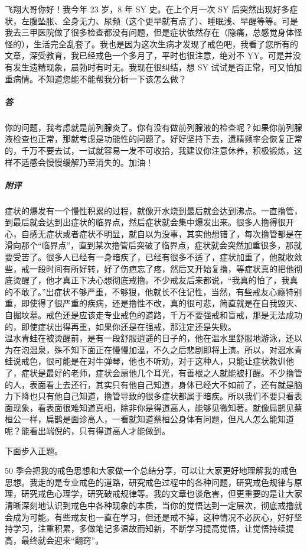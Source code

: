 \begin{case}
    飞翔大哥你好！我今年 23 岁，8 年 SY 史。在上个月一次 SY 后突然出现好多症状，左腹坠胀、全身无力、尿频（这个更早就有点了）、睡眠浅、早醒等等。可是我去三甲医院做了很多检查都没有问题，但是症状依然存在（隐痛，总感觉身体怪怪的），生活完全乱套了。我也是因为这次生病才发现了戒色吧，我看了您所有的文章，深受教育，我已经戒色一个多月了，平时也很注意，绝对不 YY。可是并没有发生遗精现象，晨勃时有时无。我现在很纠结，想 SY 试试是否正常，可又怕加重病情。不知道您能不能帮我分析一下该怎么做？
    \subparagraph{答} 你的问题，我考虑就是前列腺炎了。你有没有做前列腺液的检查呢？如果你前列腺液检查也正常，那就考虑是功能性的问题了。好好坚持下去，遗精频率会恢复正常的，千万不要去试，一试就容易一发不可收拾，我建议你注意休养，积极锻炼，这样不适感会慢慢缓解乃至消失的。加油！
    \subparagraph{附评} 症状的爆发有一个慢性积累的过程，就像开水烧到最后就会达到沸点。一直撸管，到最后就会达到出症状的临界点，然后症状就会集中爆发出来。很多人撸得很开心，自感无症状或者症状不明显，就自以为没事，其实他想错了，每次撸管都是在滑向那个“临界点”，直到某次撸管后突破了临界点，症状就会突然加重很多，那就要受苦了。很多人已经有一身暗疾了，已经有很多不适了，症状加重了，他就收敛些，戒一段时间有所好转，好了伤疤忘了疼，然后又开始复撸，等症状真的把他彻底烫醒了，他才真正下决心想彻底戒撸。不少戒友后来都说，“我真的怕了，我真的不敢了。”出症状不够严重，不够狠，他就长不住记性，当然，有些戒友心瘾特别重，即使得了很严重的疾病，还是撸性不改，真的很可悲，简直就是在自我毁灭、自掘坟墓。戒色还是应该走专业戒色的道路，千万不要强戒和盲戒，那是无法成功的，即使症状出得再重，如果你还是在强戒，那注定还是失败。\\ 温水青蛙在被烫醒前，是有一段舒服逍遥的日子的，他在温水里舒服地游泳，还以为在泡温泉，殊不知下面正在慢慢加温，不久之后悲剧即将上演。所以，对温水青蛙说戒色，很可能是在对牛弹琴，他也不听劝，对于这种人，只能让症状教训他了，症状是最好的老师，症状会扇他几个耳光，有善根之人就能被打醒。不少撸管的人，表面看上去还行，其实只有他自己知道，身体已经大不如前了，还有就是脑力下降也只有他自己知道，撸管导致的很多症状都属于暗疾。所以我们不要只看表面现象，看表面很难知道真相，除非你是得道高人，能够见微知著。就像扁鹊见蔡桓公一样，扁鹊是面诊高人，一看就知道蔡桓公身体有问题，但凡人怎么能知道呢？能看出端倪的，只有得道高人才能做到。
\end{case}

下面步入正题。

50 季会把我的戒色思想和大家做一个总结分享，可以让大家更好地理解我的戒色思想。我走的是专业戒色的道路，研究戒色过程中的各种问题，研究戒色规律与原理，研究戒色心理学，研究破戒规律等。我的文章也谈危害，但更重要的是让大家清晰深刻地认识到戒色中各种现象的本质，当你的觉悟达到一定层次，彻底戒撸就会成为可能。有些戒友也一直在学习，但还是戒不掉，这种情况不必灰心，好好坚持学习，注重积累，多做笔记多温故而知新，不断学习提高觉悟，让觉悟持续提高，最终就会迎来“翻窍”。

